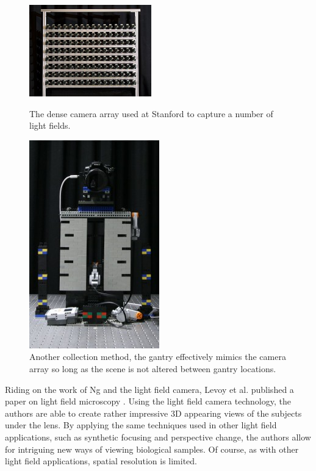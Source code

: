 \documentclass[12pt]{report}
\begin{document}
\begin{figure}[!ht]
	\centering
	\begin{minipage}{0.45\textwidth}
		\centering
		\includegraphics[scale=0.9]{stanford_camera_array.png}
		\caption{The dense camera array used at Stanford to capture a number of light fields.}
		\label{fig:camera_array}
	\end{minipage}\hfill
	\begin{minipage}{0.45\textwidth}
		\centering
		\includegraphics[scale=0.5]{lego_gantry.jpg}
		\caption{Another collection method, the gantry effectively mimics the camera array so long as the scene is not altered between gantry locations.}
		\label{fig:lego_gantry}
	\end{minipage}
\end{figure}
Riding on the work of Ng and the light field camera, Levoy et al. published a paper on light field microscopy \cite{Levoy06b}. Using the light field camera technology, the authors are able to create rather impressive 3D appearing views of the subjects under the lens. By applying the same techniques used in other light field applications, such as synthetic focusing and perspective change, the authors allow for intriguing new ways of viewing biological samples. Of course, as with other light field applications, spatial resolution is limited.
\end{document}
